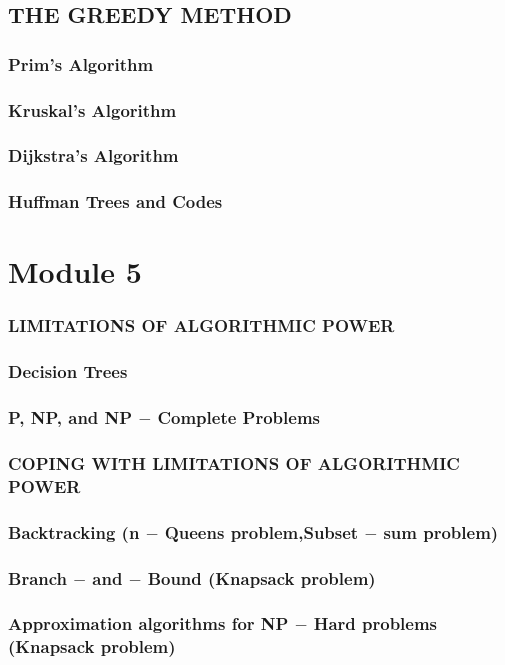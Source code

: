 \documentclass{article}
\begin{document}
	\subsection{THE GREEDY METHOD}
	\subsubsection{Prim's Algorithm}
	\subsubsection{Kruskal's Algorithm}
	\subsubsection{Dijkstra's Algorithm}
	\subsubsection{Huffman Trees and Codes}
	\newpage

	\section{Module 5}
	\subsubsection{LIMITATIONS OF ALGORITHMIC POWER}
	\subsubsection{Decision Trees}
	\subsubsection{P, NP, and NP $-$ Complete Problems}

	\subsubsection{COPING WITH LIMITATIONS OF ALGORITHMIC POWER}
	\subsubsection{Backtracking (n $-$ Queens problem,Subset $-$ sum problem)}
	\subsubsection{Branch $-$ and $-$ Bound (Knapsack problem)}
	\subsubsection{Approximation algorithms for NP $-$ Hard problems (Knapsack problem)}
\end{document}
